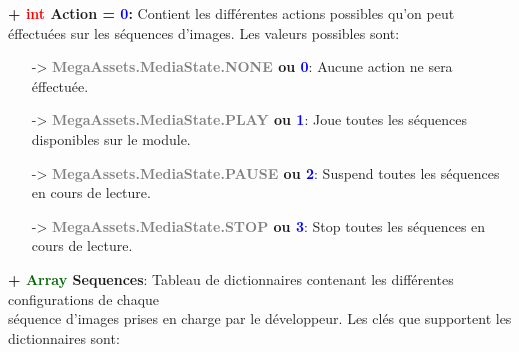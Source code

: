 \documentclass[a4paper, 11pt]{article}
\begin{document}
	\textbf{+ \textcolor{red}{int} Action = \textcolor{blue}{0}:} Contient les différentes actions possibles
	qu'on peut éffectuées sur les séquences d'images. Les valeurs possibles sont:
	\begin{itemize}
		\item[-> \textbf{\textcolor{gray}{MegaAssets.MediaState.NONE} ou \textcolor{blue}{0}}:] Aucune
		action ne sera éffectuée.
		\item[-> \textbf{\textcolor{gray}{MegaAssets.MediaState.PLAY} ou \textcolor{blue}{1}}:] Joue toutes
		les séquences disponibles sur le module.
		\item[-> \textbf{\textcolor{gray}{MegaAssets.MediaState.PAUSE} ou \textcolor{blue}{2}}:] Suspend
		toutes les séquences en cours de lecture.
		\item[-> \textbf{\textcolor{gray}{MegaAssets.MediaState.STOP} ou \textcolor{blue}{3}}:] Stop toutes
		les séquences en cours de lecture.\\
	\end{itemize}
	\textbf{+ \textcolor{darkgreen}{Array} Sequences}: Tableau de dictionnaires contenant les différentes
	configurations de chaque \\séquence d'images prises en charge par le développeur. Les clés que
	supportent les dictionnaires sont:
\end{document}
